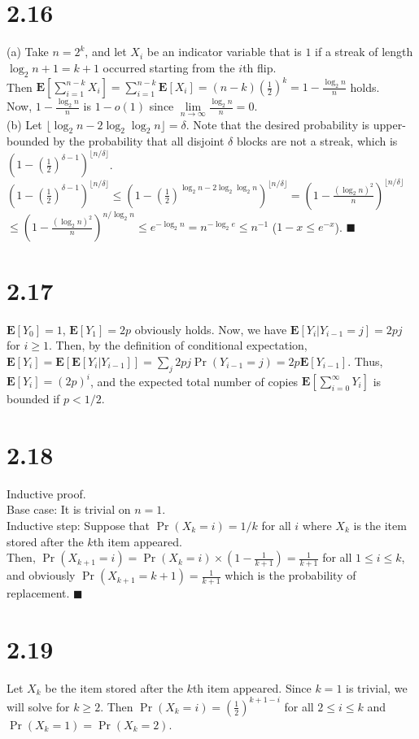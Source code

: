 \documentclass{article}
\begin{document}
\section*{2.16}
(a) Take $n=2^k$, and let $X_i$ be an indicator variable that is $1$ if a streak of length $\log_2n+1=k+1$ occurred starting from the $i$th flip.\\
Then $\textbf{E}[\sum\limits_{i=1}^{n-k}X_i]=\sum\limits_{i=1}^{n-k}\textbf{E}[X_i]=(n-k)(\frac{1}{2})^k=1-\frac{\log_2n}{n}$ holds.\\
Now, $1-\frac{\log_2n}{n}$ is $1-o(1)$ since $\lim\limits_{n\rightarrow\infty}\frac{\log_2n}{n}=0$.\\
(b) Let $\lfloor \log_2 n - 2\log_2\log_2 n \rfloor=\delta$.
Note that the desired probability is upper-bounded by the probability that all disjoint $\delta$ blocks are not a streak, which is $(1-(\frac{1}{2})^{\delta-1})^{\lfloor n/\delta \rfloor}$.\\
$(1-(\frac{1}{2})^{\delta-1})^{\lfloor n/\delta \rfloor}\leq(1-(\frac{1}{2})^{\log_2n-2\log_2\log_2n})^{\lfloor n/\delta \rfloor}=(1-\frac{(\log_2n)^2}{n})^{\lfloor n/\delta \rfloor}$\\
$\leq(1-\frac{(\log_2n)^2}{n})^{n/\log_2n}\leq e^{-\log_2n}=n^{-\log_2e}\leq n^{-1}$ ($1-x\leq e^{-x}$). $\blacksquare$
\section*{2.17}
$\textbf{E}[Y_0]=1$, $\textbf{E}[Y_1]=2p$ obviously holds. Now, we have $\textbf{E}[Y_i|Y_{i-1}=j]=2pj$ for $i\geq 1$.
Then, by the definition of conditional expectation, $\textbf{E}[Y_i]=\textbf{E}[\textbf{E}[Y_i|Y_{i-1}]]=\sum_j2pj\Pr(Y_{i-1}=j)=2p\textbf{E}[Y_{i-1}]$.
Thus, $\textbf{E}[Y_i]=(2p)^i$, and the expected total number of copies $\textbf{E}[\sum\limits_{i=0}^\infty Y_i]$ is bounded if $p<1/2$.
\section*{2.18}
Inductive proof.\\
Base case: It is trivial on $n=1$.\\
Inductive step: Suppose that $\Pr(X_k=i)=1/k$ for all $i$ where $X_k$ is the item stored after the $k$th item appeared.\\
Then, $\Pr(X_{k+1}=i)=\Pr(X_k=i)\times(1-\frac{1}{k+1})=\frac{1}{k+1}$ for all $1\leq i \leq k$, and obviously $\Pr(X_{k+1}=k+1)=\frac{1}{k+1}$ which is the probability of replacement. $\blacksquare$
\section*{2.19}
Let $X_k$ be the item stored after the $k$th item appeared. Since $k=1$ is trivial, we will solve for $k\geq 2$.
Then $\Pr(X_k=i)=(\frac{1}{2})^{k+1-i}$ for all $2\leq i\leq k$ and $\Pr(X_k=1)=\Pr(X_k=2)$.
\end{document}
